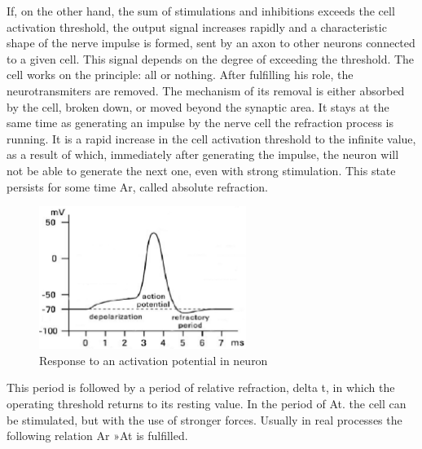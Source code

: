 If, on the other hand, the sum of stimulations and inhibitions exceeds the cell activation
threshold, the output signal increases rapidly and a characteristic shape of
the nerve impulse is formed, sent by an axon to other neurons connected to a given cell.
This signal depends on the degree of exceeding the threshold.
The cell works on the principle: all or nothing. After fulfilling his role, the neurotransmiters
are removed. The mechanism of its removal is either absorbed by the cell,
broken down, or moved beyond the synaptic area.
It stays at the same time as generating an impulse by the nerve cell the refraction
process is running.
It is a rapid increase in the cell activation threshold to the infinite value, 
as a result of which, immediately after generating the impulse, the neuron will not be able 
to generate the next one, even with strong stimulation. This state persists for some time Ar,
called absolute refraction.
\begin{figure}[htb] 
	\label{fig:bio_activation}
	\centering
	\includegraphics[width=0.6\textwidth]{figures/bio_activation}
	\caption{Response to an activation potential in neuron}
\end{figure}
This period is followed by a period of relative refraction, delta t, in which the operating
threshold returns to its resting value. In the period of At.
the cell can be stimulated, but with the use of stronger forces.
Usually in real processes the following relation Ar »At is fulfilled.

\FloatBarrier
